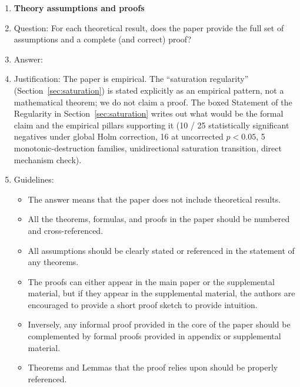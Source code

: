 \begin{enumerate}
\item {\bf Theory assumptions and proofs}
    \item[] Question: For each theoretical result, does the paper provide the full set of assumptions and a complete (and correct) proof?
    \item[] Answer: \answerNA{}
    \item[] Justification: The paper is empirical. The ``saturation regularity'' (Section~\ref{sec:saturation}) is stated explicitly as an empirical pattern, not a mathematical theorem; we do not claim a proof. The boxed Statement of the Regularity in Section~\ref{sec:saturation} writes out what would be the formal claim and the empirical pillars supporting it (10 / 25 statistically significant negatives under global Holm correction, 16 at uncorrected $p<0.05$, 5 monotonic-destruction families, unidirectional saturation transition, direct mechanism check). 
    \item[] Guidelines:
    \begin{itemize}
        \item The answer \answerNA{} means that the paper does not include theoretical results.
        \item All the theorems, formulas, and proofs in the paper should be numbered and cross-referenced.
        \item All assumptions should be clearly stated or referenced in the statement of any theorems.
        \item The proofs can either appear in the main paper or the supplemental material, but if they appear in the supplemental material, the authors are encouraged to provide a short proof sketch to provide intuition.
        \item Inversely, any informal proof provided in the core of the paper should be complemented by formal proofs provided in appendix or supplemental material.
        \item Theorems and Lemmas that the proof relies upon should be properly referenced.
    \end{itemize}


\end{enumerate}
